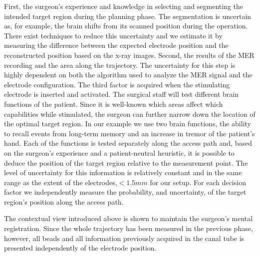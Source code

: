 \documentclass{vgtc}                          %
\begin{document}
First, the surgeon's experience and knowledge in selecting and segmenting the intended target region during the planning phase. The segmentation is uncertain as, for example, the brain shifts from its scanned position during the operation. There exist techniques to reduce this uncertainty and we estimate it by measuring the difference between the expected electrode position and the reconstructed position based on the x-ray images. Second, the results of the MER recording and the area along the trajectory. The uncertainty for this step is highly dependent on both the algorithm used to analyze the MER signal and the electrode configuration. The third factor is acquired when the stimulating electrode is inserted and activated. The surgical staff will test different brain functions of the patient. Since it is well-known which areas affect which capabilities while stimulated, the surgeon can further narrow down the location of the optimal target region. In our example we use two brain functions, the ability to recall events from long-term memory and an increase in tremor of the patient's hand. Each of the functions is tested separately along the access path and, based on the surgeon's experience and a patient-neutral heuristic, it is possible to deduce the position of the target region relative to the measurement point. The level of uncertainty for this information is relatively constant and in the same range as the extent of the electrodes,$< 1.5 mm$ for our setup. For each decision factor we independently measure the probability, and uncertainty, of the target region's position along the access path.

The contextual view introduced above is shown to maintain the surgeon's mental registration. Since the whole trajectory has been measured in the previous phase, however, all beads and all information previously acquired in the canal tube is presented independently of the electrode position. 
\end{document}
